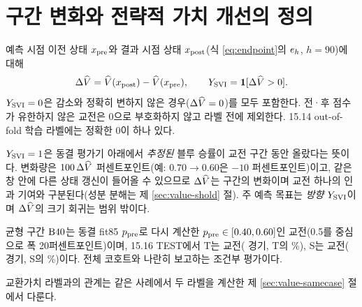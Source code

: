 \section{구간 변화와 전략적 가치 개선의 정의}
\label{sec:value-svi}

\begin{definition}
예측 시점 이전 상태 $x_{\mathrm{pre}}$와 결과 시점 상태 $x_{\mathrm{post}}$(식 \eqref{eq:endpoint}의 $e_{h}$, $h = 90$)에 대해
\begin{equation}
  \Delta\widehat V = \widehat V(x_{\mathrm{post}}) - \widehat V(x_{\mathrm{pre}}), \qquad Y_{\mathrm{SVI}} = \mathbf{1}[\Delta\widehat V > 0].
  \label{eq:svi}
\end{equation}
$Y_{\mathrm{SVI}} = 0$은 감소와 정확히 변하지 않은 경우($\Delta\widehat V = 0$)를 모두 포함한다. 전·후 점수가 유한하지 않은 교전은 0으로 부호화하지 않고 라벨 전에 제외한다. 15.14 out-of-fold 학습 라벨에는 정확한 0이 하나 있다.
\end{definition}

$Y_{\mathrm{SVI}} = 1$은 동결 평가기 아래에서 \emph{추정된} 블루 승률이 교전 구간 동안 올랐다는 뜻이다. 변화량은 $100\,\Delta\widehat V$ 퍼센트포인트(예: $0.70 \to 0.60$은 $-10$ 퍼센트포인트)이고, 같은 창 안에 다른 상태 갱신이 들어올 수 있으므로 $\Delta\widehat V$는 구간의 변화이며 교전 하나의 인과 기여와 구분된다(성분 분해는 제 \ref{sec:value-shold} 절). 주 예측 목표는 \emph{방향} $Y_{\mathrm{SVI}}$이며 $\Delta\widehat V$의 크기 회귀는 범위 밖이다.

균형 구간 $\mathrm{B40}$는 동결 fit85 $p_{\mathrm{pre}}$로 다시 계산한 $p_{\mathrm{pre}} \in [0.40, 0.60]$인 교전(0.5를 중심으로 폭 20퍼센트포인트)이며, 15.16 TEST에서 T는 \numTBforty{} 교전(\numTBfortyMatches{} 경기, T의 \shareTBforty\%), S는 \numSBforty{} 교전(\numSBfortyMatches{} 경기, S의 \shareSBforty\%)이다. 전체 코호트와 나란히 보고하는 조건부 평가이다.

교환가치 라벨과의 관계는 같은 사례에서 두 라벨을 계산한 제 \ref{sec:value-samecase} 절에서 다룬다.
